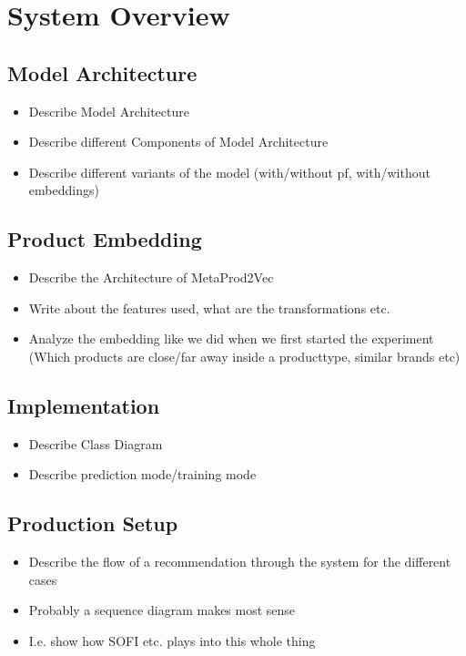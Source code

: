 \chapter{System Overview}

\section{Model Architecture}
\begin{itemize}
\item Describe Model Architecture
\item Describe different Components of Model Architecture
\item Describe different variants of the model (with/without pf, with/without embeddings)
\end{itemize}

\section{Product Embedding}
\begin{itemize}
    \item Describe the Architecture of MetaProd2Vec
    \item Write about the features used, what are the transformations etc.
    \item Analyze the embedding like we did when we first started the experiment (Which products are close/far away inside a producttype, similar brands etc)
\end{itemize}

\section{Implementation}
\begin{itemize}
\item Describe Class Diagram
\item Describe prediction mode/training mode
\end{itemize}

\section{Production Setup}
\begin{itemize}
    \item Describe the flow of a recommendation through the system for the different cases
    \item Probably a sequence diagram makes most sense
    \item I.e. show how SOFI etc. plays into this whole thing
\end{itemize}